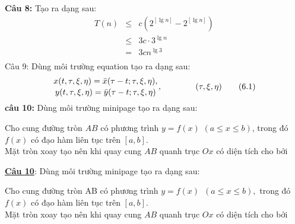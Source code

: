 \documentclass[12pt,a4paper]{book}
\theoremstyle{plain}%
\begin{document}
\textbf{Câu 8:} Tạo ra dạng sau:\\
\begin{eqnarray}
T\left( n \right) & \le & c\left( {{2^{\left[ {\lg n} \right]}} - {2^{\left[ {\lg n} \right]}}} \right)\nonumber\\
 &\le & 3c \cdot {3^{\lg n}} \nonumber\\
 & = & 3c{n^{\lg 3}}\nonumber\\
 \nonumber
\end{eqnarray}
Câu 9: Dùng môi trường equation tạo ra dạng sau:\\
\begin{equation}
{x( {t,\tau ,\xi ,\eta })=  \bar x( {\tau  - t;\tau ,\xi ,\eta } ),
\atop
y( {t,\tau ,\xi ,\eta } ) = \bar  y( {\tau  - t;\tau ,\xi ,\eta } )},
\qquad\qquad(\tau,\xi,\eta)\tag{6.1}
\end{equation}
\textbf{câu 10:} Dùng môi trường minipage tạo ra dạng sau:\\
\begin{minipage}{8cm}
Cho cung đường tròn $AB$ có phương trình $y = f\left( x \right)$  $\left( {a \le x \le b} \right)$, trong đó $f\left( x \right)$ có đạo hàm liên tục trên $\left[ {a,b} \right]$.\\
Mặt tròn xoay tạo nên khi quay cung $AB$ quanh trục $Ox$ có diện tích cho bởi
\end{minipage}
\begin{minipage}[t]{5.2cm}
\end{minipage}
\vspace{6pt}\underline{\textbf{Câu 10}}: Dùng môi trường minipage tạo ra dạng sau:\\

\begin{minipage}{8cm}
Cho cung đường tròn AB có phương trình $y=f(x) \hspace{6pt}(a\le x\le b),$ trong đó $f(x)$ có đạo hàm liên tục trên $[a,b].$\\
Mặt tròn xoay tạo nên khi quay cung $AB$ quanh trục $Ox$ có diện tích cho bởi
\end{minipage}
\qquad\begin{minipage}[t]{5cm}
\parbox{8cm}{
}
\end{minipage}
\end{document}

